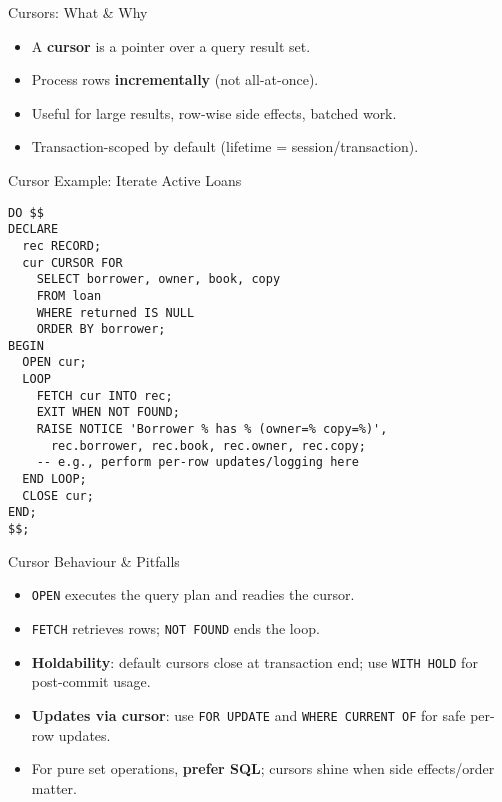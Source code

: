 \documentclass{beamer}
\begin{document}
\begin{frame}{Cursors: What \& Why}
\begin{itemize}
  \item A \textbf{cursor} is a pointer over a query result set.
  \item Process rows \textbf{incrementally} (not all-at-once).
  \item Useful for large results, row-wise side effects, batched work.
  \item Transaction-scoped by default (lifetime = session/transaction).
\end{itemize}
\end{frame}


\begin{frame}[fragile]{Cursor Example: Iterate Active Loans}
\begin{lstlisting}
DO $$
DECLARE
  rec RECORD;
  cur CURSOR FOR
    SELECT borrower, owner, book, copy
    FROM loan
    WHERE returned IS NULL
    ORDER BY borrower;
BEGIN
  OPEN cur;
  LOOP
    FETCH cur INTO rec;
    EXIT WHEN NOT FOUND;
    RAISE NOTICE 'Borrower % has % (owner=% copy=%)',
      rec.borrower, rec.book, rec.owner, rec.copy;
    -- e.g., perform per-row updates/logging here
  END LOOP;
  CLOSE cur;
END;
$$;
\end{lstlisting}
\end{frame}

\begin{frame}{Cursor Behaviour \& Pitfalls}
\begin{itemize}
  \item \texttt{OPEN} executes the query plan and readies the cursor.
  \item \texttt{FETCH} retrieves rows; \texttt{NOT FOUND} ends the loop.
  \item \textbf{Holdability}: default cursors close at transaction end; use \texttt{WITH HOLD} for post-commit usage.
  \item \textbf{Updates via cursor}: use \texttt{FOR UPDATE} and \texttt{WHERE CURRENT OF} for safe per-row updates.
  \item For pure set operations, \textbf{prefer SQL}; cursors shine when side effects/order matter.
\end{itemize}
\end{frame}
\end{document}
